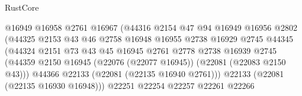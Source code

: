 \begin{lexlean}{RustCore}
\begin{coremodule}
                                          @16949
                                          @16958
                                          @2761
                                          @16967
                                          (@44316
                                            @2154
                                            @47
                                            @94
                                            @16949
                                            @16956
                                            @2802
                                            (@44325
                                              @2153
                                              @43
                                              @46
                                              @2758
                                              @16948
                                              @16955
                                              @2738
                                              @16929
                                              @2745
                                              @44345
                                              (@44324
                                                @2151
                                                @73
                                                @43
                                                @45
                                                @16945
                                                @2761
                                                @2778
                                                @2738
                                                @16939
                                                @2745
                                                (@44359
                                                  @2150
                                                  @16945
                                                  (@22076 (@22077 @16945))
                                                  (@22081 (@22083 @2150 @43)))
                                                @44366
                                                @22133
                                                (@22081 (@22135 @16940 @2761)))
                                              @22133
                                              (@22081 (@22135 @16930 @16948)))
                                            @22251
                                            @22254
                                            @22257
                                            @22261
                                            @22266

\end{coremodule}
\end{lexlean}
